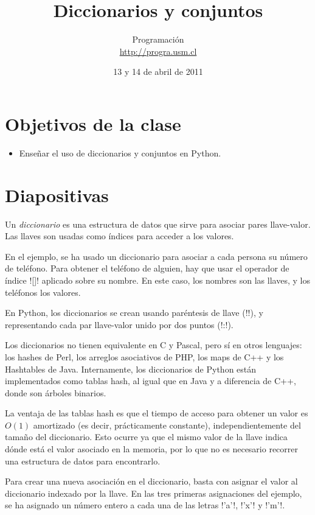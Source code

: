 \documentclass[10pt]{article}
\title{Diccionarios y conjuntos}
\author{Programación \\ \url{http://progra.usm.cl}}
\date{13 y 14 de abril de 2011}
\begin{document}
  \maketitle

  \section*{Objetivos de la clase}
  \begin{itemize}
    \item Enseñar el uso de diccionarios y conjuntos en Python.
  \end{itemize}

  \section*{Diapositivas}


  Un \emph{diccionario} es una estructura de datos
  que sirve para asociar pares llave-valor.
  Las llaves son usadas como índices
  para acceder a los valores.

  En el ejemplo,
  se ha usado un diccionario
  para asociar a cada persona su número de teléfono.
  Para obtener el teléfono de alguien,
  hay que usar el operador de índice \li![]!
  aplicado sobre su nombre.
  En este caso,
  los nombres son las llaves,
  y los teléfonos los valores.

  En Python, los diccionarios se crean usando paréntesis de llave (\li!{}!),
  y representando cada par llave-valor unido por dos puntos (\li!:!).

  Los diccionarios no tienen equivalente en C y Pascal,
  pero sí en otros lenguajes:
  los hashes de Perl,
  los arreglos asociativos de PHP,
  los maps de C++
  y los Hashtables de Java.
  Internamente,
  los diccionarios de Python están implementados como tablas hash,
  al igual que en Java y a diferencia de C++, donde son árboles binarios.

  La ventaja de las tablas hash
  es que el tiempo de acceso para obtener un valor es \(O(1)\) amortizado
  (es decir, prácticamente constante),
  independientemente del tamaño del diccionario.
  Esto ocurre ya que el mismo valor de la llave
  indica dónde está el valor asociado en la memoria,
  por lo que no es necesario recorrer una estructura de datos
  para encontrarlo.


  Para crear una nueva asociación en el diccionario,
  basta con asignar el valor al diccionario indexado por la llave.
  En las tres primeras asignaciones del ejemplo,
  se ha asignado un número entero
  a cada una de las letras \li!'a'!, \li!'x'! y \li!'m'!.
\end{document}
